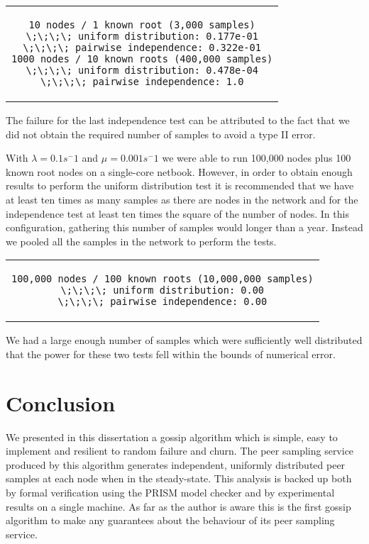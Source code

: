 \documentclass[a4paper,10pt]{article}
\newenvironment{prismprop}[0]{
  \begin{center}
  \begin{tabular}{c}
  \footnotesize
}{
  \end{tabular}
  \end{center}
}
\begin{document}
\begin{prismprop}
\begin{lstlisting}
10 nodes / 1 known root (3,000 samples)
\;\;\;\; uniform distribution: 0.177e-01
\;\;\;\; pairwise independence: 0.322e-01
1000 nodes / 10 known roots (400,000 samples)
\;\;\;\; uniform distribution: 0.478e-04
\;\;\;\; pairwise independence: 1.0
\end{lstlisting}
\end{prismprop}

The failure for the last independence test can be attributed to the fact that we did not obtain the required number of samples to avoid a type II error.

With $\lambda=0.1 s^-1$ and $\mu=0.001 s^-1$ we were able to run 100,000 nodes plus 100 known root nodes on a single-core netbook. However, in order to obtain enough results to perform the uniform distribution test it is recommended that we have at least ten times as many samples as there are nodes in the network and for the independence test at least ten times the square of the number of nodes. In this configuration, gathering this number of samples would longer than a year. Instead we pooled all the samples in the network to perform the tests.

\begin{prismprop}
\begin{lstlisting}
100,000 nodes / 100 known roots (10,000,000 samples)
\;\;\;\; uniform distribution: 0.00
\;\;\;\; pairwise independence: 0.00
\end{lstlisting}
\end{prismprop}

We had a large enough number of samples which were sufficiently well distributed that the power for these two tests fell within the bounds of numerical error.

\section{Conclusion}

We presented in this dissertation a gossip algorithm which is simple, easy to implement and resilient to random failure and churn. The peer sampling service produced by this algorithm generates independent, uniformly distributed peer samples at each node when in the steady-state. This analysis is backed up both by formal verification using the PRISM model checker and by experimental results on a single machine. As far as the author is aware this is the first gossip algorithm to make any guarantees about the behaviour of its peer sampling service.
\end{document}

